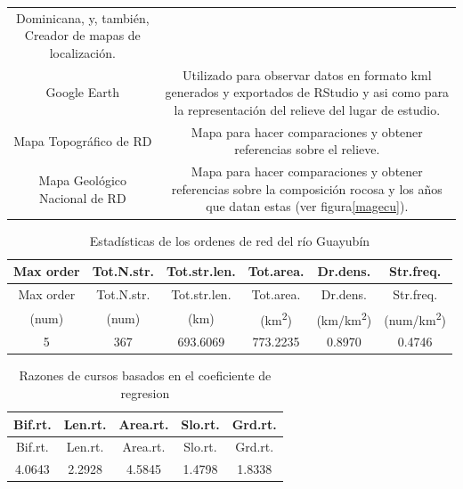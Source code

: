 \documentclass[11pt,]{article}
\begin{document}
\begin{longtable}[]{@{}cc@{}}
\begin{minipage}[t]{0.83\columnwidth}
Dominicana, y, también, Creador de mapas de localización.\strut
\end{minipage}\tabularnewline
\begin{minipage}[t]{0.11\columnwidth}\centering\strut
Google Earth\strut
\end{minipage} & \begin{minipage}[t]{0.83\columnwidth}\centering\strut
Utilizado para observar datos en formato kml generados y exportados de
RStudio y asi como para la representación del relieve del lugar de
estudio.\strut
\end{minipage}\tabularnewline
\begin{minipage}[t]{0.11\columnwidth}\centering\strut
Mapa Topográfico de RD\strut
\end{minipage} & \begin{minipage}[t]{0.83\columnwidth}\centering\strut
Mapa para hacer comparaciones y obtener referencias sobre el
relieve.\strut
\end{minipage}\tabularnewline
\begin{minipage}[t]{0.11\columnwidth}\centering\strut
Mapa Geológico Nacional de RD\strut
\end{minipage} & \begin{minipage}[t]{0.83\columnwidth}\centering\strut
Mapa para hacer comparaciones y obtener referencias sobre la composición
rocosa y los años que datan estas (ver figura\ref{magecu}).\strut
\end{minipage}\tabularnewline
\bottomrule
\end{longtable}

\begin{longtable}[]{@{}cccccc@{}}
\caption{\label{tab:estadisticaor} Estadísticas de los ordenes de red
del río Guayubín}\tabularnewline
\toprule
Max order & Tot.N.str. & Tot.str.len. & Tot.area. & Dr.dens. &
Str.freq.\tabularnewline
\midrule
\endfirsthead
\toprule
Max order & Tot.N.str. & Tot.str.len. & Tot.area. & Dr.dens. &
Str.freq.\tabularnewline
\midrule
\endhead
(num) & (num) & (km) & (km\textsuperscript{2}) &
(km/km\textsuperscript{2}) & (num/km\textsuperscript{2})\tabularnewline
5 & 367 & 693.6069 & 773.2235 & 0.8970 & 0.4746\tabularnewline
\bottomrule
\end{longtable}

\begin{longtable}[]{@{}ccccc@{}}
\caption{\label{tab:regresionc} Razones de cursos basados en el
coeficiente de regresion}\tabularnewline
\toprule
Bif.rt. & Len.rt. & Area.rt. & Slo.rt. & Grd.rt.\tabularnewline
\midrule
\endfirsthead
\toprule
Bif.rt. & Len.rt. & Area.rt. & Slo.rt. & Grd.rt.\tabularnewline
\midrule
\endhead
4.0643 & 2.2928 & 4.5845 & 1.4798 & 1.8338\tabularnewline
\bottomrule
\end{longtable}
\end{document}
